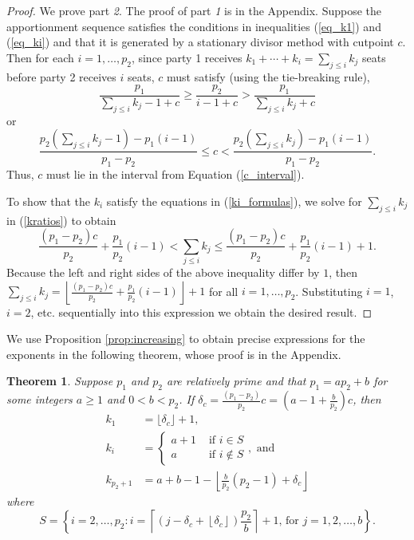 \documentclass[pdflatex,sn-mathphys-num]{sn-jnl}
\theoremstyle{thmstyleone}%
\newtheorem{theorem}{Theorem}%
\theoremstyle{thmstyletwo}%
\theoremstyle{thmstylethree}%
\begin{document}
 \begin{proof}
We prove  part {\it 2}. The proof of part {\it 1} is in the Appendix.  Suppose the apportionment sequence satisfies the conditions in inequalities (\ref{eq_k1}) and (\ref{eq_ki}) and that it is generated by a stationary divisor method with cutpoint $c$. Then for each $i= 1, \ldots, p_2$, since party 1 receives $k_1 + \cdots +k_i=\sum_{j \le i} k_j$ seats before party 2 receives $i$ seats, $c$ must satisfy (using the tie-breaking rule),
\begin{equation}\label{kratios}
\frac{p_1}{\sum_{j \le i}k_j -1+c} \ge \frac{p_2}{i-1+c}  > \frac{p_1}{\sum_{j \le i}k_j +c}
\end{equation}
or
\begin{equation}\label{cratios}
\frac{p_2(\sum_{j \le i}k_j -1)-p_1(i-1)}{p_1-p_2} \le c < \frac{p_2(\sum_{j \le i}k_j) -p_1(i-1)}{p_1-p_2}.
\end{equation}Thus, $c$ must lie in the interval from Equation (\ref{c_interval}).

To show that  the $k_i$ satisfy the equations in (\ref{ki_formulas}), we solve for $\sum_{j \le i} k_j$ in (\ref{kratios}) to obtain
$$\frac{(p_1-p_2)c}{p_2} + \frac{p_1}{p_2}(i-1)  <   \sum_{j \le i}k_j \le \frac{(p_1-p_2)c}{p_2} + \frac{p_1}{p_2}(i-1) +1.$$
Because the left and right sides of the above inequality differ by $1$, then $\sum_{j \le i}k_j = \left\lfloor \frac{(p_1-p_2)c}{p_2} + \frac{p_1}{p_2}(i-1) \right\rfloor +1$ for all $i=1, \ldots, p_2$.  Substituting $i=1$, $i=2$, etc. sequentially into this expression we obtain the desired result. \end{proof}

We use Proposition \ref{prop:increasing} to obtain  precise expressions for the exponents in the following theorem, whose proof is in the Appendix.




  \begin{theorem}\label{amax}
 Suppose  $p_1$ and $p_2$ are relatively prime and that $p_1=ap_2+b$ for some integers $a \ge 1$ and $0< b <p_2$. If $\delta_c =  \frac{(p_1-p_2)}{p_2} c= (a-1+\frac{b}{p_2})c$, then
 \begin{align*}\label{ki_a}
k_1 & = \lfloor \delta_c \rfloor + 1,\\
k_i  & =\left\{ \begin{array}{cl} a+1 & \mbox{ if } i \in S   \\  
a & \mbox{ if }  i \notin S  \end{array} \right. , \mbox{ and}\\
k_{p_2+1} &=a+b-1 - \left\lfloor \frac{b}{p_2} (p_2-1)+ \delta_c \right\rfloor
\end{align*}
where  $$S = \left\{i = 2, \ldots, p_2 : i = \left\lceil (j- \delta_c+ \left\lfloor  \delta_c \right\rfloor)\frac{p_2}{b} \right\rceil + 1 \mbox{, for  } j = 1, 2, \ldots, b\right\}.$$
 \end{theorem}
 
\end{document}
